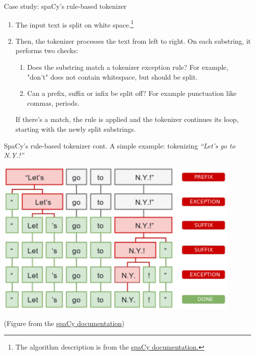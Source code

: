 \documentclass[style=upen, size=14pt]{powerdot}
\theoremstyle{definition}
\begin{document}
\begin{slide}[toc=spaCy]{Case study: spaCy's rule-based tokenizer}

  \begin{enumerate}
  \item The input text is split on white space.\footnote{The algorithm
    description is from the
    \href{https://spacy.io/usage/linguistic-features\#tokenization}{spaCy
      documentation.}}
  \item Then, the tokenizer processes the text from left to right. On each
    substring, it performs two checks:
    \begin{enumerate}
    \item Does the substring match a tokenizer exception rule? For example,
      "don't" does not contain whitespace, but should be split.
    \item Can a prefix, suffix or infix be split off? For example punctuation
      like commas, periods.
    \end{enumerate}
    If there's a match, the rule is applied and the tokenizer continues
    its loop, starting with the newly split substrings.
  \end{enumerate}

\end{slide}

\begin{slide}[toc=]{SpaCy's rule-based tokenizer cont.}
  A simple example: tokenizing \emph{``Let's go to N.Y.!''}
    \begin{center}
      \includegraphics[width=0.9\textwidth]{figures/spacy_tokenizer.eps}\
      
      \footnotesize{(Figure from the \href{https://spacy.io/usage/linguistic-features\#tokenization}{spaCy documentation})}
    \end{center}
\end{slide}
\end{document}
